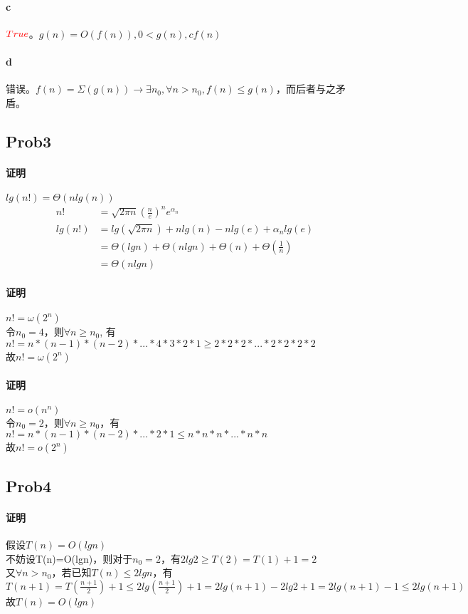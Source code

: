 \documentclass{ctexart}
\begin{document}
\paragraph{c} $\color{red}{True}$。$g(n)=O(f(n)),0<g(n),cf(n)$
\paragraph{d} 错误。$f(n)=\Sigma (g(n)) \to \exists n_0, \forall n>n_0, f(n)\leq g(n)$，而后者与之矛盾。

\subsection{Prob3}
\paragraph{证明}$lg(n!)=\Theta(nlg(n))$
\begin{align*}
    n! &=\sqrt{2\pi n}(\frac{n}{e})^n e^{\alpha_n} \\
    lg(n!) &=lg(\sqrt{2\pi n})+nlg(n)-nlg(e)+\alpha_n lg(e) \\
           &=\Theta(lgn)+\Theta(nlgn)+\Theta(n)+\Theta(\frac{1}{n})\\
           &=\Theta(nlgn)
\end{align*}
\paragraph{证明}$n!=\omega(2^n)$\\
令$n_0=4$，则$\forall n\ge n_0$, 有\\
$n!=n*(n-1)*(n-2)*...*4*3*2*1 \ge 2*2*2*...*2*2*2*2$\\
故$n! = \omega(2^n)$\\
\paragraph{证明}$n!=o(n^n)$\\
令$n_0=2$，则$\forall n\ge n_0$，有\\
$n!=n*(n-1)*(n-2)*...*2*1 \leq n*n*n*...*n*n $\\
故$n! = o(2^n)$

\subsection{Prob4}
\paragraph{证明}假设$T(n)=O(lgn)$\\
不妨设T(n)=O(lgn)，则对于$n_0=2$，有$2lg2 \ge T(2)=T(1)+1=2$\\
又$\forall n>n_0$，若已知$T(n)\le 2lgn$，有$T(n+1)=T(\frac{n+1}{2})+1 \le 2lg(\frac{n+1}{2})+1=2lg(n+1)-2lg2+1=2lg(n+1)-1 \le 2lg(n+1)$\\
故$T(n)=O(lgn)$
\end{document}
